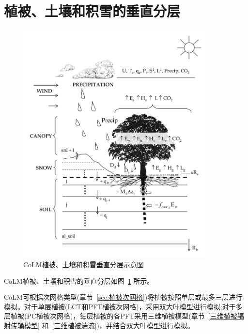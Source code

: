 \section{植被、土壤和积雪的垂直分层}\label{土壤和积雪的垂直分层}

{
\begin{figure}[htbp]
\centering
\includegraphics[width=0.9\textwidth]{Figures/模式构架/CoLM模式概念图.jpg}
\caption[CoLM植被、土壤和积雪垂直分层示意图]{CoLM植被、土壤和积雪垂直分层示意图}
\label{fig:CoLM垂直分层}
\end{figure}
}

CoLM植被、土壤和积雪的垂直分层如图~\ref{fig:CoLM垂直分层} 所示。

CoLM可根据次网格类型(章节~\ref{sec:植被次网格})将植被按照单层或最多三层进行模拟。对于单层植被(LCT和PFT植被次网格)，采用双大叶模型进行模拟\citep{dai2004two};对于多层植被(PC植被次网格)，每层植被的各PFT采用三维植被模型(章节~\ref{三维植被辐射传输模型} 和~\ref{三维植被湍流})，并结合双大叶模型进行模拟。

